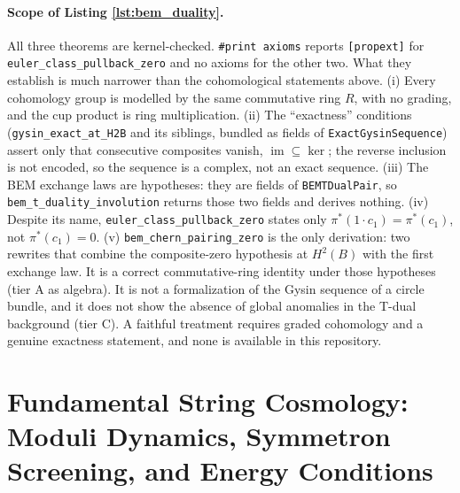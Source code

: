 \documentclass[11pt,a4paper]{article}
\begin{document}
\paragraph{Scope of Listing \ref{lst:bem_duality}.} All three theorems are kernel-checked. \texttt{\#print axioms} reports \texttt{[propext]} for \texttt{euler\_class\_pullback\_zero} and no axioms for the other two. What they establish is much narrower than the cohomological statements above. (i) Every cohomology group is modelled by the same commutative ring $R$, with no grading, and the cup product is ring multiplication. (ii) The ``exactness'' conditions (\texttt{gysin\_exact\_at\_H2B} and its siblings, bundled as fields of \texttt{ExactGysinSequence}) assert only that consecutive composites vanish, $\operatorname{im} \subseteq \ker$; the reverse inclusion is not encoded, so the sequence is a complex, not an exact sequence. (iii) The BEM exchange laws are hypotheses: they are fields of \texttt{BEMTDualPair}, so \texttt{bem\_t\_duality\_involution} returns those two fields and derives nothing. (iv) Despite its name, \texttt{euler\_class\_pullback\_zero} states only $\pi^*(1 \cdot c_1) = \pi^*(c_1)$, not $\pi^*(c_1) = 0$. (v) \texttt{bem\_chern\_pairing\_zero} is the only derivation: two rewrites that combine the composite-zero hypothesis at $H^2(B)$ with the first exchange law. It is a correct commutative-ring identity under those hypotheses (tier A as algebra). It is not a formalization of the Gysin sequence of a circle bundle, and it does not show the absence of global anomalies in the T-dual background (tier C). A faithful treatment requires graded cohomology and a genuine exactness statement, and none is available in this repository.


\section{Fundamental String Cosmology: Moduli Dynamics, Symmetron Screening, and Energy Conditions}
\end{document}
